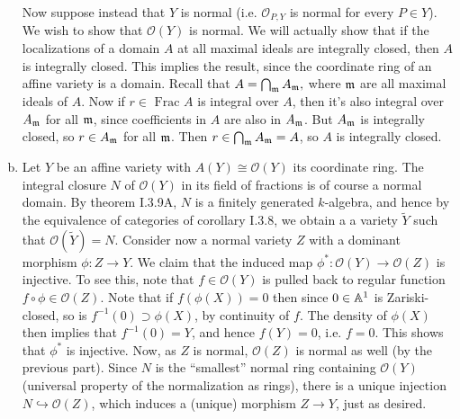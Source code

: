 \documentclass{mathnotes}
\begin{document}
\begin{enumerate}[(a)]
        Now suppose instead that $Y$ is normal (i.e. $\mathcal{O}_{P,Y}$ is normal for every
        $P\in Y$). We wish to show that $\mathcal{O}(Y)$ is normal. We will actually show that
        if the localizations of a domain $A$ at all maximal ideals are integrally closed,
        then $A$ is integrally closed. This implies the result, since the coordinate ring
        of an affine variety is a domain. Recall that $A = \bigcap_{\mathfrak m} A_{\mathfrak m},$ 
        where $\mathfrak m$ are all maximal ideals of $A$. Now if $r \in$ $\text{Frac }A$ is integral over
        $A$, then it's also integral over $A_{\mathfrak m}$ for all $\mathfrak m$, since coefficients in $A$
        are also in $A_{\mathfrak m}$. But $A_{\mathfrak m}$ is integrally closed, so $r \in A_{\mathfrak m}$
        for all $\mathfrak m$. Then $r \in \bigcap_{\mathfrak m} A_{\mathfrak m} = A$, so $A$ is integrally closed.
    \item Let $Y$ be an affine variety with $A(Y)\cong\mathcal{O}(Y)$ its coordinate ring.
        The integral closure $N$ of $\mathcal{O}(Y)$ in its field of fractions
        is of course a normal domain. By theorem I.3.9A, $N$ is a finitely generated
        $k$-algebra, and hence by the equivalence of categories of corollary I.3.8,
        we obtain a a variety $\tilde Y$ such that $\mathcal{O}(\tilde Y)=N$. Consider
        now a normal variety $Z$ with a dominant morphism $\phi:Z\to Y$.
        We claim that the induced map $\phi^*:\mathcal{O}(Y)\to\mathcal{O}(Z)$ is injective.
        To see this, note that $f\in\mathcal{O}(Y)$ is pulled back to regular function
        $f\circ \phi\in\mathcal{O}(Z)$.
        Note that if $f(\phi(X))=0$ then since $0\in\mathbb{A}^1$ is Zariski-closed, so is
        $f^{-1}(0)\supset\phi(X)$, by continuity of $f$. The density of $\phi(X)$ then implies that
        $f^{-1}(0)=Y$, and hence $f(Y)=0$, i.e. $f=0$. This shows that $\phi^*$
        is injective.
        Now, as $Z$ is normal, $\mathcal{O}(Z)$ is normal as well (by the previous part). Since
        $N$ is the ``smallest'' normal ring containing $\mathcal{O}(Y)$ (universal property
        of the normalization as rings), there is a unique
        injection $N\hookrightarrow\mathcal{O}(Z)$, which induces a (unique) morphism
        $Z\to Y$, just as desired.

\end{enumerate}
\end{document}
